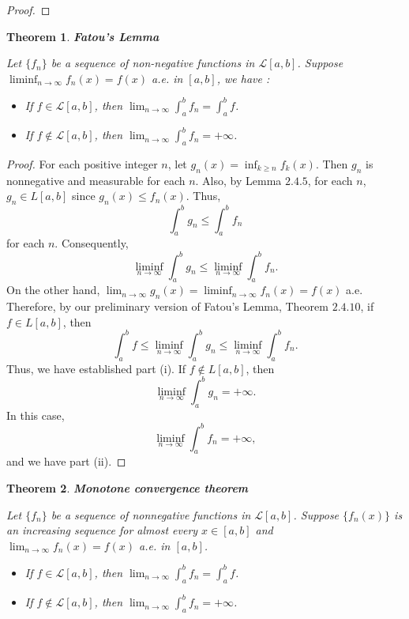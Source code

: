 \documentclass[12pt]{amsart}
\theoremstyle{plain}
\newtheorem{thm}{Theorem}[section]
\theoremstyle{definition}
\theoremstyle{remark}
\numberwithin{equation}{section}
\numberwithin{thm}{section}
\begin{document}
\begin{proof}
\end{proof}


\begin{thm}
\textbf{Fatou's Lemma}

Let $\{ f_n \}$ be a sequence of non-negative functions in $\mathcal{L}[a,b]$. Suppose $\liminf_{n \to \infty} f_n(x) = f(x)$ a.e. in $[a,b]$, we have : 
\begin{itemize}
    \item [(i)] If $f \in \mathcal{L}[a,b]$, then $\lim_{ n \to \infty} \int_a^b f_n = \int_a^b f$.
    \item [(ii)] If $f \notin \mathcal{L}[a,b]$, then $\lim_{ n \to \infty} \int_a^b f_n = + \infty$. 
\end{itemize}    
\end{thm}
 \begin{proof}
     For each positive integer $n$, let $g_n(x) = \inf_{k \geq n} f_k(x)$. Then $g_n$ is nonnegative and measurable for each $n$. Also, by Lemma $2.4.5$, for each $n$, $g_n \in L[a, b]$ since $g_n(x) \leq f_n(x)$. Thus,
\[ \int_{a}^{b} g_n \leq \int_{a}^{b} f_n \]
for each $n$. Consequently,
\[ \liminf_{n \to \infty} \int_{a}^{b} g_n \leq \liminf_{n \to \infty} \int_{a}^{b} f_n. \]
On the other hand, $\lim_{n \to \infty} g_n(x) = \liminf_{n \to \infty} f_n(x) = f(x)$ a.e. Therefore, by our preliminary version of Fatou’s Lemma, Theorem $2.4.10$, if $f \in L[a, b]$, then
\[ \int_{a}^{b} f \leq \liminf_{n \to \infty} \int_{a}^{b} g_n \leq \liminf_{n \to \infty} \int_{a}^{b} f_n. \]
Thus, we have established part (i). If $f \notin L[a, b]$, then
\[ \liminf_{n \to \infty} \int_{a}^{b} g_n = +\infty. \]
In this case,
\[ \liminf_{n \to \infty} \int_{a}^{b} f_n = +\infty, \]
and we have part (ii).
 \end{proof}
\begin{thm}
\textbf{Monotone convergence theorem}

Let $\{ f_n \}$ be a sequence of nonnegative functions in $\mathcal{L}[a,b]$. Suppose $\{f_n(x) \}$ is an increasing sequence for almost every $x \in [a,b]$ and $\lim_{n \to \infty} f_n(x) = f(x)$ a.e. in $[a,b]$.
\begin{itemize}
    \item [(i)] If $f \in \mathcal{L}[a,b]$, then $\lim_{n \to \infty} \int_a^b f_n = \int_a^b f$.
    \item [(ii)] If $f \notin \mathcal{L}[a,b]$, then $\lim_{n \to \infty} \int_a^b f_n = +\infty$.
\end{itemize}
\end{thm}
\end{document}
